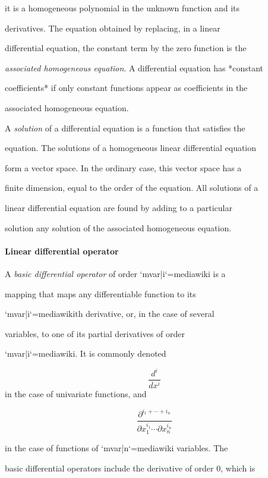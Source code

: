 it is a homogeneous polynomial in the unknown function and its

derivatives. The equation obtained by replacing, in a linear

differential equation, the constant term by the zero function is the

\textit{associated homogeneous equation}. A differential equation has *constant

coefficients* if only constant functions appear as coefficients in the

associated homogeneous equation.



A \textit{solution} of a differential equation is a function that satisfies the

equation. The solutions of a homogeneous linear differential equation

form a vector space. In the ordinary case, this vector space has a

finite dimension, equal to the order of the equation. All solutions of a

linear differential equation are found by adding to a particular

solution any solution of the associated homogeneous equation.



\paragraph{Linear differential operator}



A \textit{basic differential operator} of order `{{mvar|i}}`{=mediawiki} is a

mapping that maps any differentiable function to its

`{{mvar|i}}`{=mediawiki}th derivative, or, in the case of several

variables, to one of its partial derivatives of order

`{{mvar|i}}`{=mediawiki}. It is commonly denoted



$$\frac{d^i}{dx^i}$$ in the case of univariate functions, and



$$\frac{\partial^{i_1+\cdots +i_n}}{\partial x_1^{i_1}\cdots \partial x_n^{i_n}}$$

in the case of functions of `{{mvar|n}}`{=mediawiki} variables. The

basic differential operators include the derivative of order 0, which is


